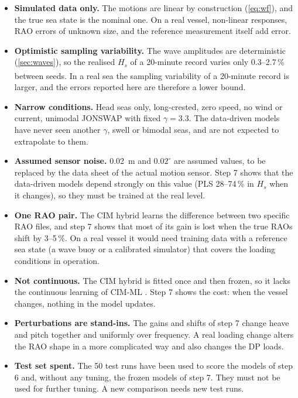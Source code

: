 \documentclass[11pt,a4paper]{article}
\newcommand{\Hs}{H_{s}}
\newcommand{\dagnote}{\textsuperscript{\dag}}
\begin{document}
\begin{itemize}
  \item \textbf{Simulated data only.} The motions are linear by construction (\cref{eq:wf}),
        and the true sea state is the nominal one. On a real vessel, non-linear responses,
        RAO errors of unknown size, and the reference measurement itself add error.
  \item \textbf{Optimistic sampling variability.} The wave amplitudes are deterministic
        (\cref{sec:waves}), so the realised $\Hs$ of a 20-minute record varies only
        0.3--2.7\,\% between seeds\dagnote. In a real sea the sampling variability of a
        20-minute record is larger, and the errors reported here are therefore a lower bound.
  \item \textbf{Narrow conditions.} Head seas only, long-crested, zero speed, no wind or current,
        unimodal JONSWAP with fixed $\gamma = 3.3$. The data-driven models have never seen
        another $\gamma$, swell or bimodal seas, and are not expected to extrapolate to them.
  \item \textbf{Assumed sensor noise.} \SI{0.02}{m} and $0.02^\circ$ are assumed values, to be
        replaced by the data sheet of the actual motion sensor. Step 7 shows that the
        data-driven models depend strongly on this value (PLS 28--74\,\% in $\Hs$ when it
        changes), so they must be trained at the real level.
  \item \textbf{One RAO pair.} The CIM hybrid learns the difference between two specific RAO files,
        and step 7 shows that most of its gain is lost when the true RAOs shift by 3--5\,\%. On a
        real vessel it would need training data with a reference sea state (a wave buoy or a
        calibrated simulator) that covers the loading conditions in operation.
  \item \textbf{Not continuous.} The CIM hybrid is fitted once and then frozen, so it lacks the
        continuous learning of CIM-ML \citep{martens2025}. Step 7 shows the cost: when the
        vessel changes, nothing in the model updates.
  \item \textbf{Perturbations are stand-ins.} The gains and shifts of step 7 change heave and pitch
        together and uniformly over frequency. A real loading change alters the RAO shape in a
        more complicated way and also changes the DP loads.
  \item \textbf{Test set spent.} The 50 test runs have been used to score the models of step 6
        and, without any tuning, the frozen models of step 7. They must not be used for further
        tuning. A new comparison needs new test runs.
\end{itemize}
\end{document}
